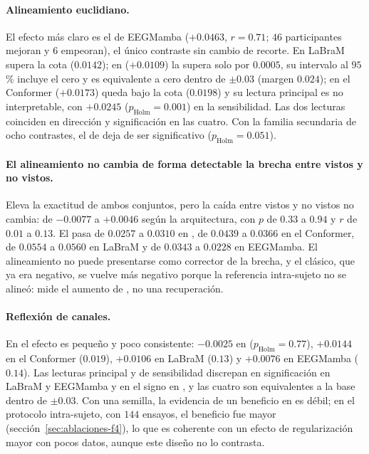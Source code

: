 \paragraph{Alineamiento euclidiano.} El efecto más claro es el de EEGMamba ($+0.0463$, $r = 0.71$; $46$
participantes mejoran y $6$ empeoran), el único contraste sin cambio de recorte. En LaBraM supera la cota
($0.0142$); en \eegnet{} ($+0.0109$) la supera solo por $0.0005$, su intervalo al $95$\,\% incluye el cero y
es equivalente a cero dentro de $\pm 0.03$ (margen $0.024$); en el Conformer ($+0.0173$) queda bajo la cota
($0.0198$) y su lectura principal es no interpretable, con $+0.0245$ ($p_{\text{Holm}} = 0.001$) en la
sensibilidad. Las dos lecturas coinciden en dirección y significación en las cuatro. Con la familia secundaria
de ocho contrastes, el de \eegnet{} deja de ser significativo ($p_{\text{Holm}} = 0.051$).

\paragraph{El alineamiento no cambia de forma detectable la brecha entre vistos y no vistos.} Eleva la
exactitud de ambos conjuntos, pero la caída entre vistos y no vistos no cambia: de $-0.0077$ a $+0.0046$
según la arquitectura, con $p$ de $0.33$ a $0.94$ y $r$ de $0.01$ a $0.13$. El \dsi{} pasa de $0.0257$ a
$0.0310$ en \eegnet{}, de $0.0439$ a $0.0366$ en el Conformer, de $0.0554$ a $0.0560$ en LaBraM y de $0.0343$
a $0.0228$ en EEGMamba. El alineamiento no puede presentarse como corrector de la brecha, y el \dsi{}
clásico, que ya era negativo, se vuelve más negativo porque la referencia intra-sujeto no se alineó: mide el
aumento de \loso{}, no una recuperación.

\paragraph{Reflexión de canales.} En \loso{} el efecto es pequeño y poco consistente: $-0.0025$ en \eegnet{}
($p_{\text{Holm}} = 0.77$), $+0.0144$ en el Conformer ($0.019$), $+0.0106$ en LaBraM ($0.13$) y $+0.0076$ en
EEGMamba ($0.14$). Las lecturas principal y de sensibilidad discrepan en significación en LaBraM y EEGMamba y
en el signo en \eegnet{}, y las cuatro son equivalentes a la base dentro de $\pm 0.03$. Con una semilla, la
evidencia de un beneficio en \loso{} es débil; en el protocolo intra-sujeto, con $144$ ensayos, el beneficio
fue mayor (sección~\ref{sec:ablaciones-f4}), lo que es coherente con un efecto de regularización mayor con
pocos datos, aunque este diseño no lo contrasta.

